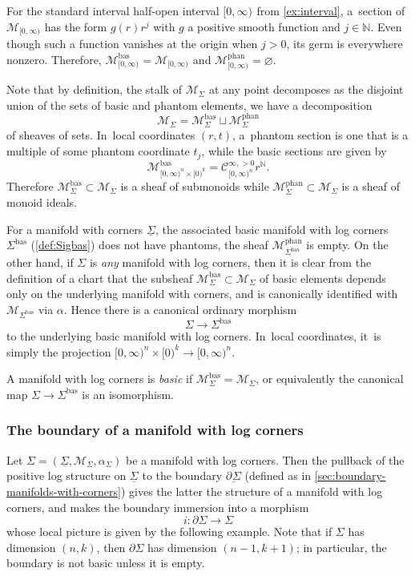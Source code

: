 \documentclass[10pt]{amsart}
\theoremstyle{definition}
\theoremstyle{remark}
\newenvironment{example}
  {\pushQED{\qed}\renewcommand{\qedsymbol}{$\lozenge$}\examplex}
  {\popQED\endexamplex}
\let\defn\emph
\newcommand{\NN}{\mathbb{N}}
\newcommand{\model}[2]{\halfspc{#1}\times[0)^{#2}}
\newcommand{\halfspc}[1]{[0,\infty)^{#1}}
\newcommand{\cM}{\mathscr{M}}
\newcommand{\cMbas}{\mathscr{M}^{\mathrm{bas}}}
\newcommand{\cMphan}{\mathscr{M}^{\mathrm{phan}}}
\newcommand{\Cinfpos}[1]{\mathscr{C}^{\infty, > 0}_{#1}}
\newcommand{\Sig}{\Sigma}
\newcommand{\uSig}{\underline{\Sigma}}
\newcommand{\bas}[1]{{#1}^{\mathrm{bas}}}
\newcommand{\Sigbas}{\bas{\Sig}}
\newcommand{\ubdSig}[1][]{\underline{\partial^{#1}\Sigma}}
\begin{document}
\begin{example}
For the standard interval half-open interval $\halfspc{}$ from \autoref{ex:interval}, a~section of $\cM_{\halfspc{}}$ has the form $g(r)r^j$ with $g$ a positive smooth function and $j\in\NN$. Even though such a function vanishes at the origin when $j>0$, its germ is everywhere nonzero. Therefore, $\cMbas_{\halfspc{}}=\cM_{\halfspc{}}$ and $\cMphan_{\halfspc{}}=\varnothing$.
\end{example}

Note that by definition, the stalk of $\cM_\Sig$ at any point decomposes as the disjoint union of the sets of basic and phantom elements, \ie we have a decomposition
\[
\cM_\Sig = \cMbas_\Sig \sqcup \cMphan_\Sig
\]
of sheaves of sets. In~local coordinates $(r,t)$, a~phantom section is one that is a multiple of some phantom coordinate $t_j$, while the basic sections are given by
\[
\cMbas_{\model{n}{k}} = \Cinfpos{\halfspc{n}}r^\NN.
\]
Therefore $\cMbas_\Sig\subset \cM_\Sig$ is a sheaf of submonoids while $\cMphan_\Sig\subset \cM_\Sig$ is a sheaf of monoid ideals.

For a manifold with corners $\uSig$, the associated basic manifold with log corners $\Sigbas$ (\autoref{def:Sigbas}) does not have phantoms, \ie the sheaf $\cMphan_{\Sigbas}$ is empty. On the other hand, if $\Sig$ is \emph{any} manifold with log corners, then it is clear from the definition of a chart that the subsheaf $\cMbas_{\Sig}\subset \cM_\Sig$ of basic elements depends only on the underlying manifold with corners, and is canonically identified with $\cM_{\Sigbas}$ via $\alpha$. Hence there is a canonical ordinary morphism
\[
\Sig \to \Sigbas
\]
to the underlying basic manifold with log corners. In~local coordinates, it~is simply the projection $\halfspc{n}\times[0)^k\to \halfspc{n}$.

\begin{definition}
A manifold with log corners is \defn{basic} if $\cMbas_{\Sig} = \cM_{\Sig}$, or equivalently the canonical map $\Sig \to \Sigbas$ is an isomorphism.
\end{definition}

\subsubsection{The boundary of a manifold with log corners}

Let $\Sig = (\uSig,\cM_\Sig,\alpha_\Sig)$ be a manifold with log corners. Then the pullback of the positive log structure on $\uSig$ to the boundary $\ubdSig$ (defined as in \autoref{sec:boundary-manifolds-with-corners}) gives the latter the structure of a manifold with log corners, and makes the boundary immersion into a morphism
\[
i\colon\partial\Sig\to \Sig
\]
whose local picture is given by the following example. Note that if $\Sig$ has dimension $(n,k)$, then $\partial\Sig$ has dimension $(n-1,k+1)$; in particular, the boundary is not basic unless it is empty.
\end{document}
